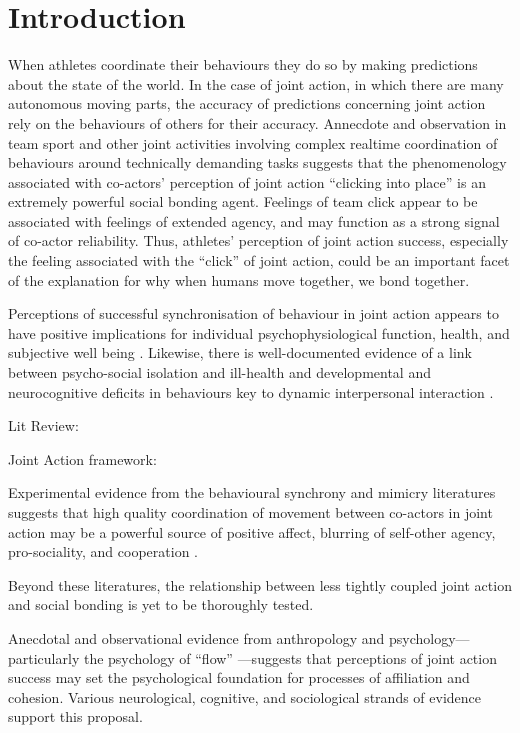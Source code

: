 \section{Introduction}
When athletes coordinate their behaviours they do so by making predictions about the state of the world.  In the case of joint action, in which there are many autonomous moving parts, the accuracy of predictions concerning joint action rely on the behaviours of others for their accuracy.  Annecdote and observation in team sport and other joint activities involving complex realtime coordination of behaviours around technically demanding tasks suggests that the phenomenology associated with co-actors' perception of joint action ``clicking into place'' is an extremely powerful social bonding agent.  Feelings of team click appear to be associated with feelings of extended agency, and may function as a strong signal of co-actor reliability.  Thus, athletes' perception of joint action success, especially the feeling associated with the ``click'' of joint action, could be an important facet of the explanation for why when humans move together, we bond together.

Perceptions of successful synchronisation of behaviour in joint action appears to have positive implications for individual psychophysiological function, health, and subjective well being \citep{Wheatley2012}.  Likewise, there is well-documented evidence of a link between psycho-social isolation and ill-health and developmental and neurocognitive deficits in behaviours key to dynamic interpersonal interaction \citep[e.g.][]{Blakemore2005,Baron-Cohen1991}.

Lit Review:

Joint Action framework:

Experimental evidence from the behavioural synchrony and mimicry literatures suggests that high quality coordination of movement between co-actors in joint action may be a powerful source of positive affect, blurring of self-other agency, pro-sociality, and cooperation \citep{Mogan2017}.

Beyond these literatures, the relationship between less tightly coupled joint action and social bonding is yet to be thoroughly tested.

Anecdotal and observational evidence from anthropology and psychology---particularly the psychology of ``flow'' \citep{Csikszentmihalyi1992,Jackson1999}---suggests that perceptions of joint action success may set the psychological foundation for processes of affiliation and cohesion.  Various neurological, cognitive, and sociological strands of evidence support this proposal.



